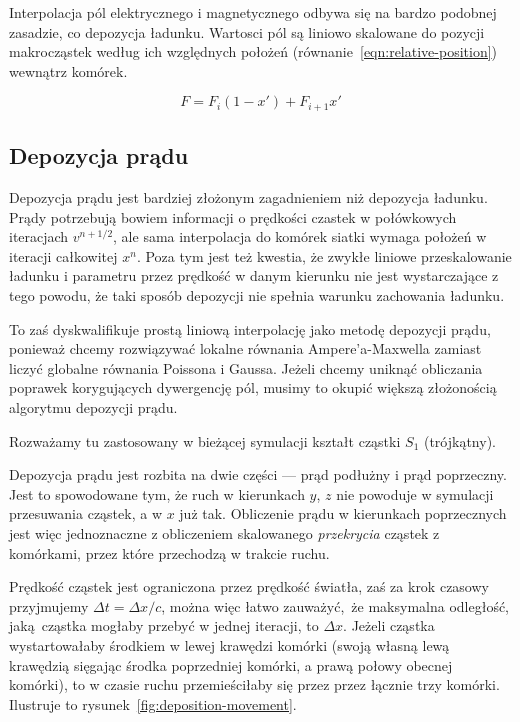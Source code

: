 Interpolacja pól elektrycznego i magnetycznego odbywa się na bardzo podobnej
zasadzie, co depozycja ładunku. Wartosci pól są liniowo skalowane do pozycji
makrocząstek według ich względnych położeń (równanie~\ref{eqn:relative-position}) wewnątrz komórek.

\begin{equation}
    F = F_i (1-x') + F_{i+1} x'
    \label{eqn:field-interpolation}
\end{equation}

\subsection{Depozycja prądu} %

Depozycja prądu jest bardziej złożonym zagadnieniem niż depozycja ładunku.
Prądy potrzebują bowiem informacji o prędkości czastek w połówkowych
iteracjach $v^{n+1/2}$, ale sama interpolacja do komórek siatki wymaga
położeń w iteracji całkowitej $x^{n}$. Poza tym jest też kwestia, że zwykłe
liniowe przeskalowanie ładunku i parametru  przez prędkość w
danym kierunku nie jest wystarczające z tego powodu, że taki sposób
depozycji nie spełnia warunku zachowania ładunku.


To zaś dyskwalifikuje prostą liniową interpolację jako metodę depozycji
prądu, ponieważ chcemy rozwiązywać lokalne równania Ampere'a-Maxwella
zamiast liczyć globalne równania Poissona i Gaussa.
Jeżeli chcemy uniknąć obliczania poprawek korygujących dywergencję pól,
musimy to okupić większą złożonością algorytmu depozycji prądu.

Rozważamy tu zastosowany w bieżącej symulacji kształt cząstki $S_1$ (trójkątny).

Depozycja prądu jest rozbita na dwie części --- prąd podłużny i prąd
poprzeczny. Jest to spowodowane tym, że ruch w kierunkach $y$, $z$ nie
powoduje w symulacji przesuwania cząstek, a w $x$ już tak. Obliczenie prądu
w kierunkach poprzecznych jest więc jednoznaczne z obliczeniem skalowanego
\emph{przekrycia} cząstek z komórkami, przez które przechodzą w trakcie
ruchu.

Prędkość cząstek jest ograniczona przez prędkość światła, zaś za krok czasowy
przyjmujemy $\Delta t = \Delta x/c$, można więc łatwo zauważyć, że maksymalna
odległość, jaką cząstka mogłaby przebyć w jednej iteracji, to $\Delta x$.
Jeżeli cząstka wystartowałaby środkiem w lewej krawędzi komórki (swoją
własną lewą krawędzią sięgając środka poprzedniej komórki, a prawą połowy
obecnej komórki), to w czasie ruchu przemieściłaby się przez
przez łącznie trzy komórki. Ilustruje to rysunek~\ref{fig:deposition-movement}.

